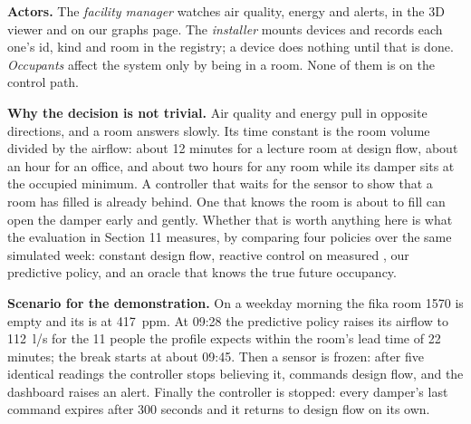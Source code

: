 \textbf{Actors.} The \emph{facility manager} watches air quality, energy and
alerts, in the 3D viewer and on our graphs page. The \emph{installer} mounts
devices and records each one's id, kind and room in the registry; a device does
nothing until that is done. \emph{Occupants} affect the system only by being in
a room. None of them is on the control path.

\textbf{Why the decision is not trivial.} Air quality and energy pull in
opposite directions, and a room answers slowly. Its \COtwo{} time constant is
the room volume divided by the airflow: about 12 minutes for a lecture room at
design flow, about an hour for an office, and about two hours for any room
while its damper sits at the occupied minimum. A controller that waits for the
\COtwo{} sensor to show that a room has filled is already behind. One that
knows the room is about to fill can open the damper early and gently. Whether
that is worth anything here is what the evaluation in Section 11 measures, by
comparing four policies over the same simulated week: constant design flow,
reactive control on measured \COtwo{}, our predictive policy, and an oracle
that knows the true future occupancy.

\textbf{Scenario for the demonstration.} On a weekday morning the fika room
1570 is empty and its \COtwo{} is at 417~ppm. At 09:28 the predictive policy
raises its airflow to 112~l/s for the 11 people the profile expects within the
room's lead time of 22 minutes; the break starts at about 09:45. Then a
\COtwo{} sensor is frozen: after five identical readings the controller stops
believing it, commands design flow, and the dashboard raises an alert. Finally
the controller is stopped: every damper's last command expires after 300
seconds and it returns to design flow on its own.

